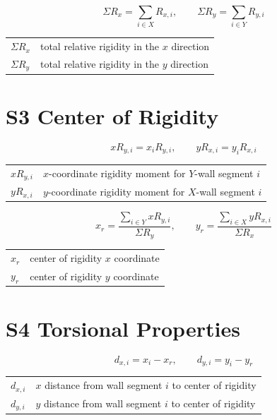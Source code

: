 \documentclass[10pt]{article}
\begin{document}
\begin{equation}
\Sigma R_x = \sum_{i\in X} R_{x,i}, \qquad
\Sigma R_y = \sum_{i\in Y} R_{y,i}
\end{equation}

{\ttfamily\footnotesize
\begin{tabular}{@{}ll@{}}
$\Sigma R_x$ & total relative rigidity in the $x$ direction \\
$\Sigma R_y$ & total relative rigidity in the $y$ direction \\
\end{tabular}
}

\section{S3 Center of Rigidity}

\begin{equation}
xR_{y,i}=x_i R_{y,i}, \qquad
yR_{x,i}=y_i R_{x,i}
\end{equation}

{\ttfamily\footnotesize
\begin{tabular}{@{}ll@{}}
$xR_{y,i}$ & $x$-coordinate rigidity moment for $Y$-wall segment $i$ \\
$yR_{x,i}$ & $y$-coordinate rigidity moment for $X$-wall segment $i$ \\
\end{tabular}
}

\begin{equation}
x_r = \frac{\sum_{i\in Y} xR_{y,i}}{\Sigma R_y}, \qquad
y_r = \frac{\sum_{i\in X} yR_{x,i}}{\Sigma R_x}
\end{equation}

{\ttfamily\footnotesize
\begin{tabular}{@{}ll@{}}
$x_r$ & center of rigidity $x$ coordinate \\
$y_r$ & center of rigidity $y$ coordinate \\
\end{tabular}
}

\section{S4 Torsional Properties}

\begin{equation}
d_{x,i}=x_i-x_r, \qquad d_{y,i}=y_i-y_r
\end{equation}

{\ttfamily\footnotesize
\begin{tabular}{@{}ll@{}}
$d_{x,i}$ & $x$ distance from wall segment $i$ to center of rigidity \\
$d_{y,i}$ & $y$ distance from wall segment $i$ to center of rigidity \\
\end{tabular}
}
\end{document}
